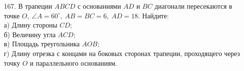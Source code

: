 167. В трапеции $ABCD$ с основаниями $AD$ и $BC$ диагонали пересекаются в точке $O,\ \angle A=60^\circ,\ AB=BC=6,\ AD=18.$ Найдите:\\
а) Длину стороны $CD;$\\
б) Величину угла $ACD;$\\
в) Площадь треугольника $AOB;$\\
г) Длину отрезка с концами на боковых сторонах трапеции, проходящего через точку $O$ и параллельного основаниям.\\
